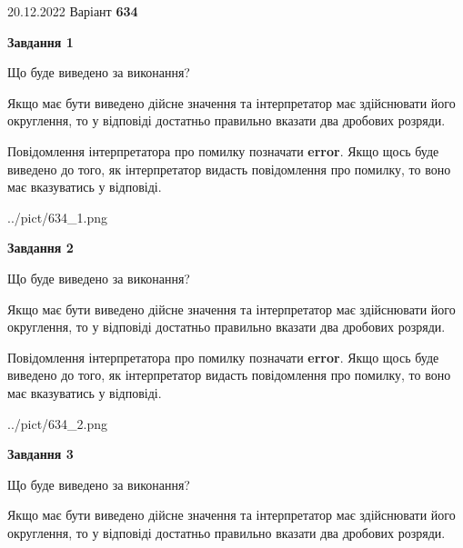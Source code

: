 \documentclass[12pt, ukrainian]{article}
\begin{document}
{20.12.2022 Варіант \No \textbf { 634 }\par}
{
\begin {Large}

{\begin {center}\textbf{Завдання 1}\end {center}}\par
Що буде виведено за виконання? \par

Якщо має бути виведено дійсне значення та інтерпретатор має здійснювати його округлення, 
то у відповіді достатньо правильно вказати два дробових розряди.

Повідомлення інтерпретатора про помилку позначати \textbf{error}.
Якщо щось буде виведено до того, як інтерпретатор видасть повідомлення про помилку, 
то воно має вказуватись у відповіді. \par

\begin{center}
	{../pict/634_1.png}
\end{center}
\newpage

{\begin {center}\textbf{Завдання 2}\end {center}}\par
Що буде виведено за виконання? \par

Якщо має бути виведено дійсне значення та інтерпретатор має здійснювати його округлення, 
то у відповіді достатньо правильно вказати два дробових розряди.

Повідомлення інтерпретатора про помилку позначати \textbf{error}.
Якщо щось буде виведено до того, як інтерпретатор видасть повідомлення про помилку, 
то воно має вказуватись у відповіді. \par

\begin{center}
	{../pict/634_2.png}
\end{center}
\newpage

{\begin {center}\textbf{Завдання 3}\end {center}}\par
Що буде виведено за виконання? \par

Якщо має бути виведено дійсне значення та інтерпретатор має здійснювати його округлення, 
то у відповіді достатньо правильно вказати два дробових розряди.


\end{Large}}
\end{document}
